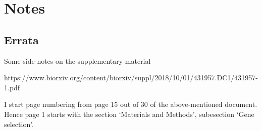 \documentclass[12pt]{article}
\begin{document}
\section{Notes}
\subsection{Errata}
Some side notes on the supplementary material

\begin{small}
https://www.biorxiv.org/content/biorxiv/suppl/2018/10/01/431957.DC1/431957-1.pdf
\end{small}

I start page numbering from page 15 out of 30 of the above-mentioned document. Hence page 1 starts with the section `Materials and Methods', subesection `Gene selection'.
\end{document}
